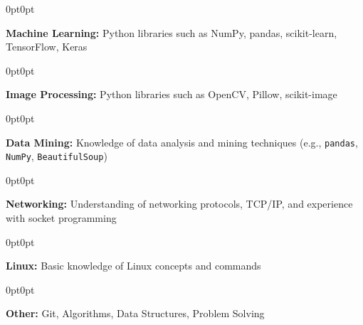 \documentclass[10pt, a4paper]{article}
\newenvironment{onecolentry}{
    \begin{adjustwidth}{0pt}{0pt}
}{\end{adjustwidth}}
\begin{document}
\vspace{0.1 cm}

\begin{onecolentry}
    \textbf{Machine Learning:} Python libraries such as NumPy, pandas, scikit-learn, TensorFlow, Keras
\end{onecolentry}

\vspace{0.1 cm}

\begin{onecolentry}
    \textbf{Image Processing:} Python libraries such as OpenCV, Pillow, scikit-image
\end{onecolentry}

\vspace{0.1 cm}

\begin{onecolentry}
    \textbf{Data Mining:} Knowledge of data analysis and mining techniques (e.g., \texttt{pandas}, \texttt{NumPy}, \texttt{BeautifulSoup})
\end{onecolentry}

\vspace{0.1 cm}

\begin{onecolentry}
    \textbf{Networking:} Understanding of networking protocols, TCP/IP, and experience with socket programming
\end{onecolentry}

\vspace{0.1 cm}

\begin{onecolentry}
    \textbf{Linux:} Basic knowledge of Linux concepts and commands
\end{onecolentry}

\vspace{0.1 cm}

\begin{onecolentry}
    \textbf{Other:} Git, Algorithms, Data Structures, Problem Solving
\end{onecolentry}
\end{document}
